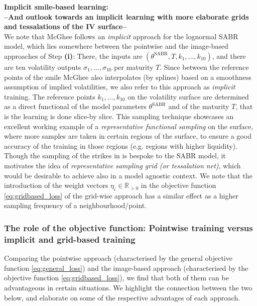 \documentclass{article}
\theoremstyle{remark}
\begin{document}
\textbf{Implicit smile-based learning: \\
--And outlook towards an implicit learning with more elaborate grids and tessalations of the IV surface--}\\ We note that McGhee \cite{McGhee} follows an \emph{implicit} approach  for the lognormal SABR model, which lies somewhere between the
pointwise and the image-based approaches of Step \textbf{(i)}: There, the inputs
are $(\theta^{\mathrm{SABR}}, T, k_1, \ldots, k_{10})$, and there are ten volatility
outputs ${\sigma_1, \ldots, \sigma_{10}}$ per maturity $T$. 
Since between the reference points of the smile McGhee \cite{McGhee} also interpolates (by splines) based on a smoothness assumption of implied volatilities, we also refer to this approach as \emph{implicit} training.
The reference points $k_1, \ldots, k_{10}$ on the volatility surface are determined as a direct functional of the model parameters $\theta^{\mathrm{SABR}}$ and of the maturity $T$, that is the learning is done slice-by slice. 
This sampling technique showcases an excellent working example of a \emph{representative functional sampling} on the surface, where more samples are taken in certain regions of the surface, to ensure a good accuracy of the training in those regions (e.g. regions with higher liquidity). Though the sampling of the strikes in \cite{McGhee} is bespoke to the SABR model, it motivates the idea of \emph{representative sampling grid (or tessalation net)}, which would be desirable to achieve also in a model agnostic context. We note that the introduction of the weight vectors $\eta_i \in \mathbb{R}_{>0}$ in the objective function \eqref{eq:gridbased_loss} of the grid-wise approach has a similar effect as a higher sampling frequency of a neighbourhood/point.

\subsubsection{The role of the objective function: Pointwise training versus implicit and grid-based training}

Comparing the pointwise approach (characterised by the general objective function \eqref{eq:general_loss}) and the image-based approach (characterised
by the objective function \eqref{eq:gridbased_loss}), we find that
both of them can be advantageous in certain situations. We highlight the connection between the two below, and
elaborate on some of the respective advantages of each approach.\\
\end{document}
